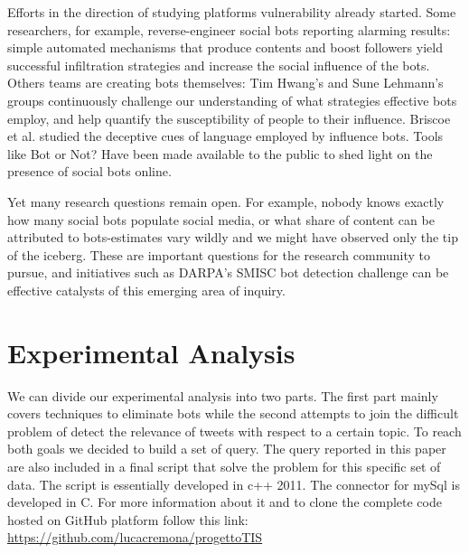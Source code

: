 \documentclass[conference, onecolumn]{IEEEtran}
\begin{document}
Efforts in the direction of studying platforms vulnerability already started. Some researchers, for example, reverse-engineer social bots reporting alarming results: simple automated mechanisms that produce contents and boost followers yield successful infiltration strategies and increase the social influence of the
bots. Others teams are creating bots themselves: Tim Hwang's and Sune Lehmann's groups continuously challenge our understanding of what strategies effective bots employ, and help quantify the susceptibility of people to their influence. Briscoe et al. studied the deceptive cues of language employed by influence bots. Tools like Bot or Not? Have been made available to the public to shed light on the presence of social bots online.
\medskip

Yet many research questions remain open. For example, nobody knows exactly how many social bots populate social media, or what share of content can be attributed to bots-estimates vary wildly and we might have observed only the tip of the iceberg. These are important questions for the research community to pursue, and initiatives such as DARPA's SMISC bot detection challenge can be effective catalysts of this emerging area of inquiry.

\section{Experimental Analysis}\label{sec:experimental analysis}
\medskip
We can divide our experimental analysis into two parts. The first part mainly covers techniques to eliminate bots while the second attempts to join the difficult problem of detect the relevance of tweets with respect to a certain topic. To reach both goals we decided to build a set of query.
The query reported in this paper are also included in a final script that solve the problem for this specific set of data. The script is essentially developed in c++ 2011. The connector for mySql is developed in C. For more information about it and to clone the complete code hosted on GitHub platform follow this link: \url{https://github.com/lucacremona/progettoTIS}
\end{document}
